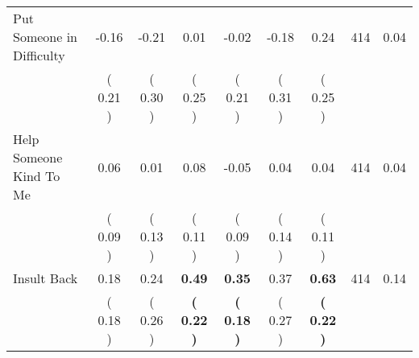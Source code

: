 \begin{tabular}{lcccccccc}
Put Someone in Difficulty &     -0.16 &     -0.21 &      0.01 &     -0.02 &     -0.18 &      0.24 & 414 &       0.04 \\ 
 & (     0.21 ) & (     0.30 ) & (     0.25 ) & (     0.21 ) & (     0.31 ) & (     0.25 ) & \\
Help Someone Kind To Me &      0.06 &      0.01 &      0.08 &     -0.05 &      0.04 &      0.04 & 414 &       0.04 \\ 
 & (     0.09 ) & (     0.13 ) & (     0.11 ) & (     0.09 ) & (     0.14 ) & (     0.11 ) & \\
Insult Back &      0.18 &      0.24 & \textbf{     0.49} & \textbf{     0.35} &      0.37 & \textbf{     0.63} & 414 &       0.14 \\ 
 & (     0.18 ) & (     0.26 ) & \textbf{(     0.22 )} & \textbf{(     0.18 )} & (     0.27 ) & \textbf{(     0.22 )} & \\
\bottomrule
\end{tabular}
